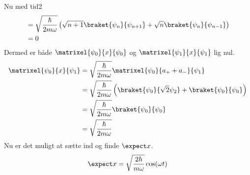 \begin{opgave}{Nu med tid}{2}
\begin{align*}
    &= \sqrt{\frac{\hbar}{2m\omega}}\left(\sqrt{n+1}\braket{\psi_n}{\psi_{n+1}}+\sqrt{n}\braket{\psi_n}{\psi_{n-1}}\right)\\
    &=0
\end{align*}
Dermed er både $\matrixel{\psi_0}{x}{\psi_0}$ og $\matrixel{\psi_1}{x}{\psi_1}$ lig nul.
\begin{align*}
    \matrixel{\psi_0}{x}{\psi_1} &= \sqrt{\frac{\hbar}{2m\omega}}\matrixel{\psi_0}{a_++a_-}{\psi_1}\\
    &=\sqrt{\frac{\hbar}{2m\omega}}\left(\braket{\psi_0}{\sqrt{2}\psi_2}+\braket{\psi_0}{\psi_0}\right)\\
    &=\sqrt{\frac{\hbar}{2m\omega}}\braket{\psi_0}{\psi_0}\\
    &=\sqrt{\frac{\hbar}{2m\omega}}
\end{align*}
Nu er det muligt at sætte ind og finde $\expect x$.
$$
\expect x = \sqrt{\frac{2\hbar}{m\omega}}\cos(\omega t)
$$
\end{opgave}